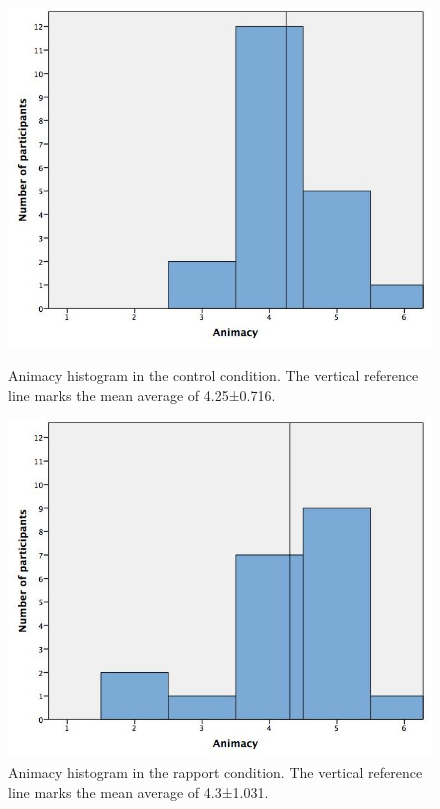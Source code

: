 \begin{figure}[ht]
	\centering
	\begin{minipage}[b]{.45\textwidth}
		\centering
		\includegraphics[width=\textwidth]{images/AnimacyBaseline.jpeg}
		\caption{Animacy histogram in the control condition. The vertical reference line marks the mean average of 4.25±0.716.}
		\label{fig:animacy_baseline}
	\end{minipage}
	\hfill
	\begin{minipage}[b]{.45\textwidth}
		\centering
		\includegraphics[width=\textwidth]{images/AnimacyRapport.jpeg}
		\caption{Animacy histogram in the rapport condition. The vertical reference line marks the mean average of 4.3±1.031.}
		\label{fig:animacy_rapport}
	\end{minipage}
\end{figure}


